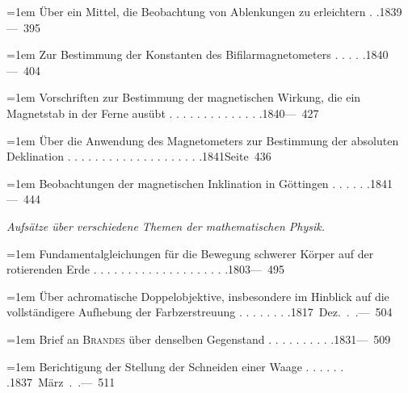 \noindent\hangindent=1em Über ein Mittel, die Beobachtung von Ablenkungen zu erleichtern . .\unskip\hspace{1em plus 1fill}\mbox{1839\quad — 395}\par\smallskip
\noindent\hangindent=1em Zur Bestimmung der Konstanten des Bifilarmagnetometers . . . . .\unskip\hspace{1em plus 1fill}\mbox{1840\quad — 404}\par\smallskip
\noindent\hangindent=1em Vorschriften zur Bestimmung der magnetischen Wirkung, die ein Magnetstab in der Ferne ausübt . . . . . . . . . . . . . .\unskip\hspace{1em plus 1fill}\mbox{1840\quad — 427}\par\smallskip
{}
\noindent\hangindent=1em Über die Anwendung des Magnetometers zur Bestimmung der absoluten Deklination . . . . . . . . . . . . . . . . . . . .\unskip\hspace{1em plus 1fill}\mbox{1841\quad Seite 436}\par\smallskip
\noindent\hangindent=1em Beobachtungen der magnetischen Inklination in Göttingen . . . . . .\unskip\hspace{1em plus 1fill}\mbox{1841\quad — 444}\par\smallskip
\par{}\medskip\noindent\textit{Aufsätze über verschiedene Themen der mathematischen Physik.}\par\smallskip
\noindent\hangindent=1em Fundamentalgleichungen für die Bewegung schwerer Körper auf der rotierenden Erde . . . . . . . . . . . . . . . . . . . .\unskip\hspace{1em plus 1fill}\mbox{1803\quad — 495}\par\smallskip
\noindent\hangindent=1em Über achromatische Doppelobjektive, insbesondere im Hinblick auf die vollständigere Aufhebung der Farbzerstreuung . . . . . . . .\unskip\hspace{1em plus 1fill}\mbox{1817 Dez. . .\quad — 504}\par\smallskip
\noindent\hangindent=1em Brief an \textsc{Brandes} über denselben Gegenstand . . . . . . . . . .\unskip\hspace{1em plus 1fill}\mbox{1831\quad — 509}\par\smallskip
\noindent\hangindent=1em Berichtigung der Stellung der Schneiden einer Waage . . . . . . .\unskip\hspace{1em plus 1fill}\mbox{1837 März . .\quad — 511}\par\smallskip
